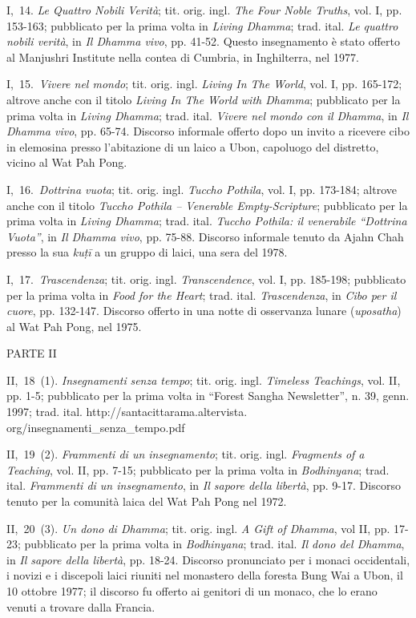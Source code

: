 I,~14. \emph{Le Quattro Nobili Verità}; tit. orig. ingl. \emph{The Four
Noble Truths}, vol. I, pp. 153-163; pubblicato per la prima volta in
\emph{Living Dhamma}; trad. ital. \emph{Le quattro nobili verità}, in
\emph{Il Dhamma vivo}, pp. 41-52. Questo insegnamento è stato offerto al
Manjushri Institute nella contea di Cumbria, in Inghilterra, nel 1977.

I,~15.~\emph{Vivere nel mondo}; tit. orig. ingl. \emph{Living In The
World}, vol. I, pp. 165-172; altrove anche con il titolo \emph{Living In
The World with Dhamma}; pubblicato per la prima volta in \emph{Living
Dhamma}; trad. ital. \emph{Vivere nel mondo con il Dhamma}, in \emph{Il
Dhamma vivo}, pp. 65-74. Discorso informale offerto dopo un invito a
ricevere cibo in elemosina presso l'abitazione di un laico a Ubon,
capoluogo del distretto, vicino al Wat Pah Pong.

I,~16.~\emph{Dottrina vuota}; tit. orig. ingl. \emph{Tuccho Pothila},
vol. I, pp. 173-184; altrove anche con il titolo \emph{Tuccho Pothila --
Venerable Empty-Scripture}; pubblicato per la prima volta in
\emph{Living Dhamma}; trad. ital. \emph{Tuccho Pothila: il venerabile
``Dottrina Vuota''}, in \emph{Il Dhamma vivo}, pp. 75-88. Discorso
informale tenuto da Ajahn Chah presso la sua \emph{kuṭī} a un gruppo di
laici, una sera del 1978.

I,~17.~\emph{Trascendenza}; tit. orig. ingl. \emph{Transcendence}, vol.
I, pp. 185-198; pubblicato per la prima volta in \emph{Food for the
Heart}; trad. ital. \emph{Trascendenza}, in \emph{Cibo per il cuore},
pp. 132-147. Discorso offerto in una notte di osservanza lunare
(\emph{uposatha}) al Wat Pah Pong, nel 1975.

PARTE II

II,~18~(1). \emph{Insegnamenti} \emph{senza tempo}; tit. orig. ingl.
\emph{Timeless Teachings}, vol. II, pp. 1-5; pubblicato per la prima
volta in ``Forest Sangha Newsletter'', n. 39, genn. 1997; trad. ital.
http://santacittarama.altervista.\\
org/insegnamenti\_senza\_tempo.pdf

II,~19~(2). \emph{Frammenti di un insegnamento}; tit. orig. ingl.
\emph{Fragments of a Teaching}, vol. II, pp. 7-15; pubblicato per la
prima volta in \emph{Bodhinyana}; trad. ital. \emph{Frammenti di un
insegnamento}, in \emph{Il sapore della libertà}, pp. 9-17. Discorso
tenuto per la comunità laica del Wat Pah Pong nel 1972.

II,~20~(3). \emph{Un dono di Dhamma}; tit. orig. ingl. \emph{A Gift of
Dhamma}, vol II, pp. 17-23; pubblicato per la prima volta in
\emph{Bodhinyana}; trad. ital. \emph{Il dono del Dhamma}, in \emph{Il
sapore della libertà}, pp. 18-24. Discorso pronunciato per i monaci
occidentali, i novizi e i discepoli laici riuniti nel monastero della
foresta Bung Wai a Ubon, il 10 ottobre 1977; il discorso fu offerto ai
genitori di un monaco, che lo erano venuti a trovare dalla Francia.

